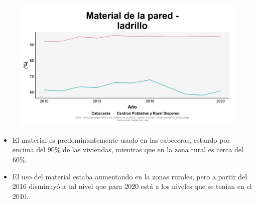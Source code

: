     \begin{figure}[H]
        \caption[Viviendas con pared de ladrillo por zonas ]{\label{pared_ladrillo_zonas} }
        \begin{center}
        \includegraphics[width=\textwidth,keepaspectratio]{img/var_151_trend.png}
        \end{center}
    \end{figure}
            \begin{itemize}
                    \item El material es predominantemente usado en las cabeceras, estando por encima del 90\% de las viviendas, mientras que en la zona rural es cerca del 60\%.
                    \item El uso del material estaba aumentando en la zonas rurales, pero a partir del 2016 disminuyó a tal nivel que para 2020 está a los niveles que se tenían en el 2010.
                    \end{itemize}

